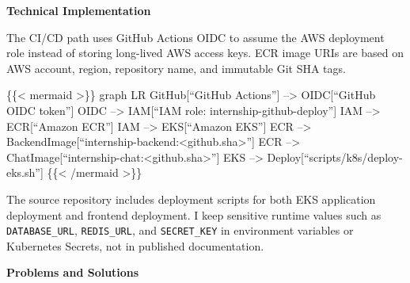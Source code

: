 \vspace{0.5em}\noindent\textbf{Technical Implementation}\par

The CI/CD path uses GitHub Actions OIDC to assume the AWS deployment
role instead of storing long-lived AWS access keys. ECR image URIs are
based on AWS account, region, repository name, and immutable Git SHA
tags.

\{\{\textless{} mermaid \textgreater\}\} graph LR GitHub{[}``GitHub
Actions''{]} --\textgreater{} OIDC{[}``GitHub OIDC token''{]} OIDC
--\textgreater{} IAM{[}``IAM role: internship-github-deploy''{]} IAM
--\textgreater{} ECR{[}``Amazon ECR''{]} IAM --\textgreater{}
EKS{[}``Amazon EKS''{]} ECR --\textgreater{}
BackendImage{[}``internship-backend:\textless github.sha\textgreater{}''{]}
ECR --\textgreater{}
ChatImage{[}``internship-chat:\textless github.sha\textgreater{}''{]}
EKS --\textgreater{} Deploy{[}``scripts/k8s/deploy-eks.sh''{]}
\{\{\textless{} /mermaid \textgreater\}\}

The source repository includes deployment scripts for both EKS
application deployment and frontend deployment. I keep sensitive runtime
values such as \texttt{DATABASE\_\allowbreak{}URL}, \texttt{REDIS\_\allowbreak{}URL}, and
\texttt{SECRET\_\allowbreak{}KEY} in environment variables or Kubernetes Secrets, not
in published documentation.

\vspace{0.5em}\noindent\textbf{Problems and Solutions}\par

